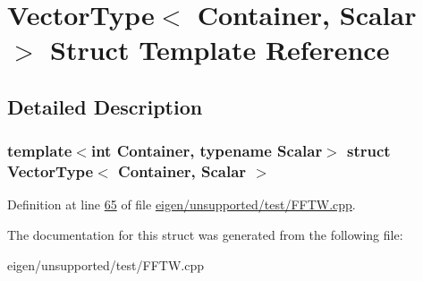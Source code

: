 \hypertarget{struct_vector_type}{}\section{Vector\+Type$<$ Container, Scalar $>$ Struct Template Reference}
\label{struct_vector_type}


\subsection{Detailed Description}
\subsubsection*{template$<$int Container, typename Scalar$>$\newline
struct Vector\+Type$<$ Container, Scalar $>$}



Definition at line \hyperlink{eigen_2unsupported_2test_2_f_f_t_w_8cpp_source_l00065}{65} of file \hyperlink{eigen_2unsupported_2test_2_f_f_t_w_8cpp_source}{eigen/unsupported/test/\+F\+F\+T\+W.\+cpp}.



The documentation for this struct was generated from the following file\+:\begin{DoxyCompactItemize}
\item 
eigen/unsupported/test/\+F\+F\+T\+W.\+cpp\end{DoxyCompactItemize}

